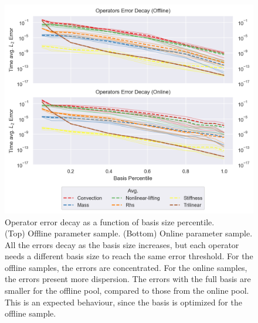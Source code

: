 \documentclass[../../thesis.tex]{subfiles}
\begin{document}
\begin{figure}[h]
    \includegraphics[width =\columnwidth]{research_project/piston/figures/nonlinear_displacement/separable/operators_error_decay_percentile.png}
    \caption{Operator error decay as a function of basis size percentile. \\
    (Top) Offline parameter sample.
    (Bottom) Online parameter sample.
    All the errors decay as the basis size increases, 
    but each operator needs a different basis size to reach the same error threshold.
    For the offline samples, the errors are concentrated.
    For the online samples, the errors present more dispersion.
    The errors with the full basis are smaller for the offline pool, 
    compared to those from the online pool.
    This is an expected behaviour, 
    since the basis is optimized for the offline sample.}
    \label{fig:nlinear_disp_operators_error_decay}
\end{figure}

\newpage
\end{document}
